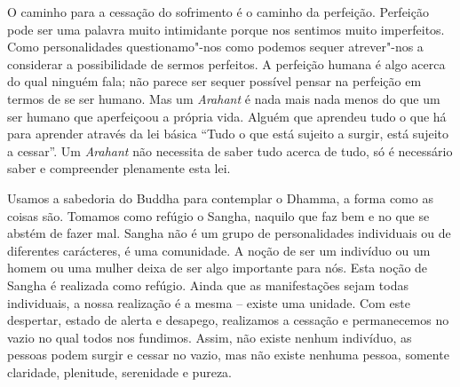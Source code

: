 O caminho para a cessação do sofrimento é o caminho da perfeição. Perfeição pode
ser uma palavra muito intimidante porque nos sentimos muito imperfeitos. Como
personalidades questionamo"-nos como podemos sequer atrever"-nos a considerar a
possibilidade de sermos perfeitos. A perfeição humana é algo acerca do qual
ninguém fala; não parece ser sequer possível pensar na perfeição em termos de se
ser humano. Mas um \emph{Arahant} é nada mais nada menos do que um ser humano que 
aperfeiçoou a própria vida. Alguém que aprendeu tudo o que há para aprender através 
da lei básica “Tudo o que está sujeito a surgir, está sujeito a cessar”. Um
\emph{Arahant} não necessita de saber tudo acerca de tudo, só é necessário saber
e compreender plenamente esta lei.

Usamos a sabedoria do Buddha para contemplar o Dhamma, a forma como as coisas
são. Tomamos como refúgio o Sangha, naquilo que faz bem e no que se abstém de
fazer mal. Sangha não é um grupo de personalidades individuais ou de diferentes
carácteres, é uma comunidade. A noção de ser um indivíduo ou um homem ou uma
mulher deixa de ser algo importante para nós. Esta noção de Sangha é realizada
como refúgio. Ainda que as manifestações sejam todas individuais, a nossa
realização é a mesma -- existe uma unidade. Com este despertar, estado de alerta e
desapego, realizamos a cessação e permanecemos no vazio no qual todos nos
fundimos. Assim, não existe nenhum indivíduo, as pessoas podem surgir e cessar
no vazio, mas não existe nenhuma pessoa, somente claridade, plenitude,
serenidade e pureza.

